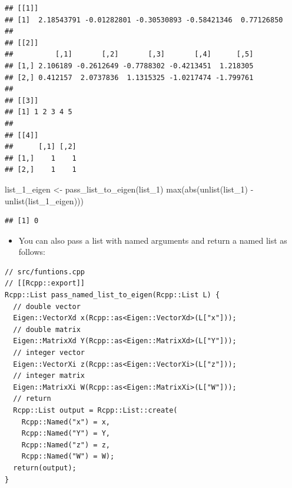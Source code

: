 \documentclass[
]{book}
\newenvironment{Shaded}{\begin{snugshade}}{\end{snugshade}}
\newcommand{\CommentTok}[1]{\textcolor[rgb]{0.56,0.35,0.01}{\textit{#1}}}
\newcommand{\FunctionTok}[1]{\textcolor[rgb]{0.00,0.00,0.00}{#1}}
\newcommand{\NormalTok}[1]{#1}
\newcommand{\OtherTok}[1]{\textcolor[rgb]{0.56,0.35,0.01}{#1}}
\newcommand{\SpecialCharTok}[1]{\textcolor[rgb]{0.00,0.00,0.00}{#1}}
\providecommand{\tightlist}{%
  \setlength{\itemsep}{0pt}\setlength{\parskip}{0pt}}
\begin{document}
\begin{verbatim}
## [[1]]
## [1]  2.18543791 -0.01282801 -0.30530893 -0.58421346  0.77126850
## 
## [[2]]
##          [,1]       [,2]       [,3]       [,4]      [,5]
## [1,] 2.106189 -0.2612649 -0.7788302 -0.4213451  1.218305
## [2,] 0.412157  2.0737836  1.1315325 -1.0217474 -1.799761
## 
## [[3]]
## [1] 1 2 3 4 5
## 
## [[4]]
##      [,1] [,2]
## [1,]    1    1
## [2,]    1    1
\end{verbatim}

\begin{Shaded}
\begin{Highlighting}[]
\NormalTok{list\_1\_eigen }\OtherTok{\textless{}{-}} \FunctionTok{pass\_list\_to\_eigen}\NormalTok{(list\_1)}
\FunctionTok{max}\NormalTok{(}\FunctionTok{abs}\NormalTok{(}\FunctionTok{unlist}\NormalTok{(list\_1) }\SpecialCharTok{{-}} \FunctionTok{unlist}\NormalTok{(list\_1\_eigen)))}
\end{Highlighting}
\end{Shaded}

\begin{verbatim}
## [1] 0
\end{verbatim}

\begin{itemize}
\tightlist
\item
  You can also pass a list with named arguments and return a named list as follows:
\end{itemize}

\begin{verbatim}
// src/funtions.cpp
// [[Rcpp::export]]
Rcpp::List pass_named_list_to_eigen(Rcpp::List L) {
  // double vector
  Eigen::VectorXd x(Rcpp::as<Eigen::VectorXd>(L["x"]));
  // double matrix
  Eigen::MatrixXd Y(Rcpp::as<Eigen::MatrixXd>(L["Y"]));
  // integer vector
  Eigen::VectorXi z(Rcpp::as<Eigen::VectorXi>(L["z"]));
  // integer matrix
  Eigen::MatrixXi W(Rcpp::as<Eigen::MatrixXi>(L["W"]));
  // return
  Rcpp::List output = Rcpp::List::create(
    Rcpp::Named("x") = x, 
    Rcpp::Named("Y") = Y, 
    Rcpp::Named("z") = z, 
    Rcpp::Named("W") = W);
  return(output);
}
\end{verbatim}

\begin{Shaded}
\end{Shaded}
\end{document}
